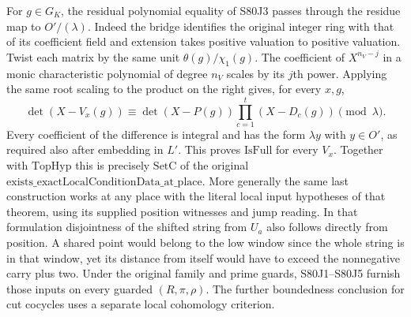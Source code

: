 For $g\in G_K$, the residual polynomial equality of S80J3 passes
through the residue map to $O'/(\lambda)$. Indeed the bridge
identifies the original integer ring with that of its coefficient
field and extension takes positive valuation to positive valuation.
Twist each matrix by the same unit $\theta(g)/\chi_1(g)$.
The coefficient of $X^{n_V-j}$ in a monic characteristic polynomial
of degree $n_V$ scales by its $j$th power. Applying the same root
scaling to the product on the right gives, for every $x,g$,
\[
 \det(X-V_x(g))\equiv
 \det(X-P(g))\prod_{c=1}^t(X-D_c(g))\pmod\lambda .
\]
Every coefficient of the difference is integral and has the form
$\lambda y$ with $y\in O'$, as required also after embedding in
$L'$. This proves $\mathrm{IsFull}$ for every $V_x$. Together with
$\mathrm{TopHyp}$ this is precisely $\mathrm{SetC}$ of the original
$\mathrm{exists\_exactLocalConditionData\_at\_place}$. More generally
the same last construction works at any place with the literal local
input hypotheses of that theorem, using its supplied position
witnesses and jump reading. In that formulation disjointness of the
shifted string from $U_a$ also follows directly from position. A
shared point would belong to the low window since the whole string
is in that window, yet its distance from itself would have to exceed
the nonnegative carry plus two. Under the original family and prime
guards, S80J1--S80J5 furnish those inputs on every guarded
$(R,\pi,\rho)$. The further boundedness conclusion for cut cocycles
uses a separate local cohomology criterion.
